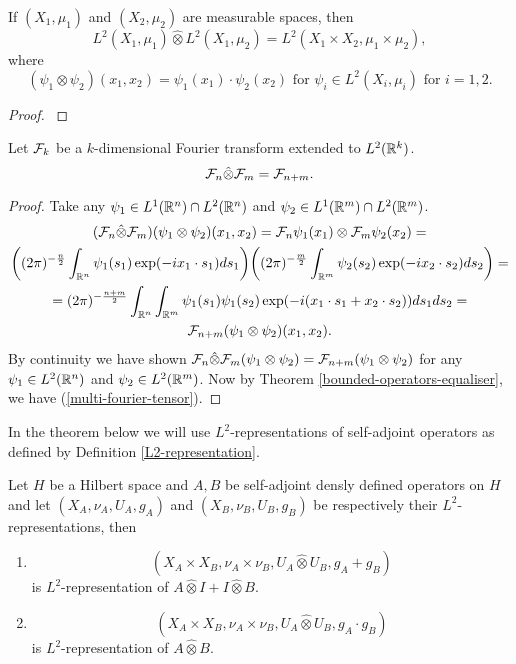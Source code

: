 \documentclass[main.tex]{subfiles}
\begin{document}
\begin{theorem}
If $(X_1,\mu_1)$ and $(X_2, \mu_2)$ are measurable spaces, then 
\begin{equation}
L^2(X_1, \mu_1) \hat{\otimes} L^2(X_1, \mu_2) = L^2(X_1\times X_2, \mu_1 \times \mu_2),
\end{equation}
where
\begin{equation}
(\psi_1 \otimes \psi_2)(x_1, x_2) = \psi_1(x_1) \cdot \psi_2(x_2) \text{ for } \psi_i\in L^2(X_i, \mu_i) \text{ for } i=1,2. 
\end{equation}
\end{theorem}
\begin{proof}
\cite[see][2.6 Constructions with Hilbert Spaces]{kadison-ringrose1983_I}
\end{proof}
\begin{example}
Let $\mathcal{F}_k$ be a $k$-dimensional Fourier transform extended to $L^2(\mathbb{R}^k)$.
\begin{equation}
\label{multi-fourier-tensor}
\mathcal{F}_n \hat{\otimes} \mathcal{F}_m = \mathcal{F}_{n + m}.
\end{equation}
\end{example}
\begin{proof}
Take any $\psi_1\in L^1(\mathbb{R}^n)\cap L^2(\mathbb{R}^n)$ and $\psi_2\in L^1(\mathbb{R}^m)\cap L^2(\mathbb{R}^m)$.
\begin{multline}
(\mathcal{F}_n \hat{\otimes} \mathcal{F}_m)(\psi_1 \otimes \psi_2)(x_1, x_2) = \mathcal{F}_n\psi_1(x_1) \otimes \mathcal{F}_m\psi_2(x_2) = \\
\bigg((2\pi)^{-\frac{n}{2}} \int_{\mathbb{R}^n} \psi_1(s_1)\exp(-ix_1\cdot s_1)ds_1\bigg)
\bigg((2\pi)^{-\frac{m}{2}} \int_{\mathbb{R}^m} \psi_2(s_2)\exp(-ix_2\cdot s_2)ds_2\bigg) = \\
= (2\pi)^{-\frac{n + m}{2}} \int_{\mathbb{R}^n} \int_{\mathbb{R}^m} \psi_1(s_1)\psi_1(s_2)\exp(-i(x_1\cdot s_1 + x_2\cdot s_2))ds_1ds_2 = \\
\mathcal{F}_{n+m}(\psi_1 \otimes \psi_2)(x_1, x_2).
\end{multline}
By continuity we have shown $\mathcal{F}_n \hat{\otimes} \mathcal{F}_m(\psi_1 \otimes \psi_2) = \mathcal{F}_{n+m}(\psi_1 \otimes \psi_2)$ for any $\psi_1\in L^2(\mathbb{R}^n)$ and $\psi_2\in L^2(\mathbb{R}^m)$. Now by Theorem \ref{bounded-operators-equaliser}, we have (\ref{multi-fourier-tensor}).
\end{proof}
In the theorem below we will use $L^2$-representations of self-adjoint operators as defined by Definition \ref{L2-representation}.
\begin{theorem}
Let $H$ be a Hilbert space and $A,B$ be self-adjoint densly defined operators on $H$ and let $(X_A, \nu_A, U_A, g_A)$ and $(X_B, \nu_B, U_B, g_B)$ be respectively their $L^2$-representations, then
\begin{enumerate}
\item
$$(X_A\times X_B, \nu_A\times\nu_B, U_A \hat{\otimes} U_B, g_A + g_B)$$
is $L^2$-representation of
$A\hat{\otimes} I + I \hat{\otimes} B$.
\item
$$(X_A\times X_B, \nu_A\times\nu_B, U_A \hat{\otimes} U_B, g_A \cdot g_B)$$
is $L^2$-representation of $A\hat{\otimes} B$.
\end{enumerate} 
\end{theorem}
\end{document}
